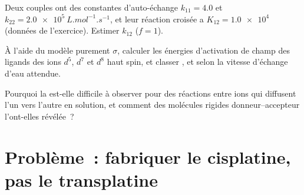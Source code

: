 \begin{exercise}[$\star\star\star$]\label{exo:b3:complex-mechanisms:10}
Deux couples ont des constantes d'auto-échange $k_{11} = 4.0$ et $k_{22} = \qty{2.0e5}{L.mol^{-1}.s^{-1}}$, et
leur réaction croisée a $K_{12} = \num{1.0e4}$ (données de l'exercice). Estimer $k_{12}$ ($f = 1$).
\end{exercise}

\begin{exercise}[$\star\star\star$]\label{exo:b3:complex-mechanisms:11}
À l'aide du modèle purement $\sigma$, calculer les énergies d'activation de
champ des ligands des ions $d^5$, $d^7$ et $d^8$ haut spin, et classer
,  et  selon la vitesse d'échange d'eau
attendue.
\end{exercise}

\begin{exercise}[$\star\star\star$]\label{exo:b3:complex-mechanisms:12}
Pourquoi la  est-elle difficile à observer pour des
réactions entre ions qui diffusent l'un vers l'autre en solution, et
comment des molécules rigides donneur--accepteur l'ont-elles révélée~?
\end{exercise}

\section{Problème~: fabriquer le cisplatine, pas le transplatine}

